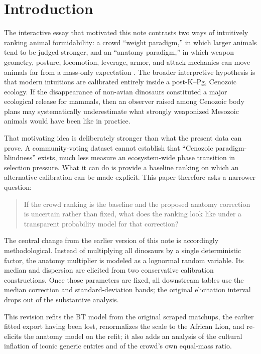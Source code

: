 \documentclass[11pt]{article}
\begin{document}
\tableofcontents
\newpage

\section{Introduction}

The interactive essay that motivated this note contrasts two ways of intuitively ranking animal formidability: a crowd ``weight paradigm,'' in which larger animals tend to be judged stronger, and an ``anatomy paradigm,'' in which weapon geometry, posture, locomotion, leverage, armor, and attack mechanics can move animals far from a mass-only expectation \cite{benanderDino2026}. The broader interpretive hypothesis is that modern intuitions are calibrated entirely inside a post-K--Pg, Cenozoic ecology. If the disappearance of non-avian dinosaurs constituted a major ecological release for mammals, then an observer raised among Cenozoic body plans may systematically underestimate what strongly weaponized Mesozoic animals would have been like in practice.

That motivating idea is deliberately stronger than what the present data can prove. A community-voting dataset cannot establish that ``Cenozoic paradigm-blindness'' exists, much less measure an ecosystem-wide phase transition in selection pressure. What it can do is provide a baseline ranking on which an alternative calibration can be made explicit. This paper therefore asks a narrower question:

\begin{quote}
If the crowd ranking is the baseline and the proposed anatomy correction is uncertain rather than fixed, what does the ranking look like under a transparent probability model for that correction?
\end{quote}

The central change from the earlier version of this note is accordingly methodological. Instead of multiplying all dinosaurs by a single deterministic factor, the anatomy multiplier is modeled as a lognormal random variable. Its median and dispersion are elicited from two conservative calibration constructions. Once those parameters are fixed, all downstream tables use the median correction and standard-deviation bands; the original elicitation interval drops out of the substantive analysis.

This revision refits the BT model from the original scraped matchups, the earlier fitted export having been lost, renormalizes the scale to the African Lion, and re-elicits the anatomy model on the refit; it also adds an analysis of the cultural inflation of iconic generic entries and of the crowd's own equal-mass ratio.
\end{document}
